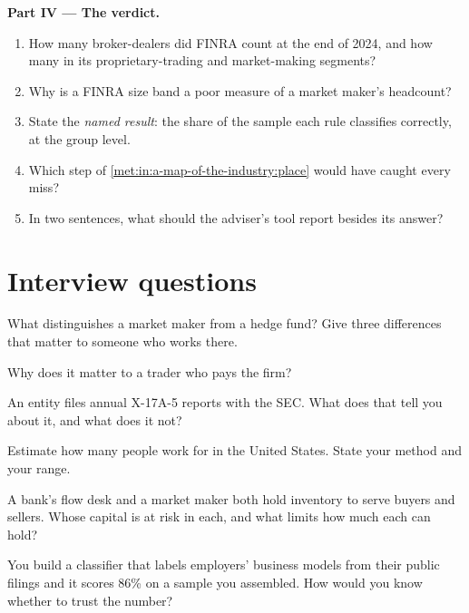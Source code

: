\begin{problem}
\medskip\noindent\textbf{Part IV --- The verdict.}
\begin{enumerate}[resume]
\item How many broker-dealers did FINRA count at the end of 2024, and how many in its proprietary-trading and
market-making segments?
\item Why is a FINRA size band a poor measure of a market maker's headcount?
\item State the \emph{named result}: the share of the sample each rule classifies correctly, at the group level.
\item Which step of \cref{met:in:a-map-of-the-industry:place} would have caught every miss?
\item In two sentences, what should the adviser's tool report besides its answer?
\end{enumerate}
\end{problem}

\section{Interview questions}

\begin{interviewq}\label{iq:in:a-map-of-the-industry:1}
What distinguishes a market maker from a hedge fund? Give three differences that matter to someone who works there.
\end{interviewq}

\begin{interviewq}\label{iq:in:a-map-of-the-industry:2}
Why does it matter to a trader who pays the firm?
\end{interviewq}

\begin{interviewq}\label{iq:in:a-map-of-the-industry:3}
An entity files annual X-17A-5 reports with the SEC. What does that tell you about it, and what does it not?
\end{interviewq}

\begin{interviewq}\label{iq:in:a-map-of-the-industry:4}
Estimate how many people work for  in the United States. State your method and your range.
\end{interviewq}

\begin{interviewq}\label{iq:in:a-map-of-the-industry:5}
A bank's flow desk and a market maker both hold inventory to serve buyers and sellers. Whose capital is at risk in each,
and what limits how much each can hold?
\end{interviewq}

\begin{interviewq}\label{iq:in:a-map-of-the-industry:6}
You build a classifier that labels employers' business models from their public filings and it scores 86\% on a sample
you assembled. How would you know whether to trust the number?
\end{interviewq}
